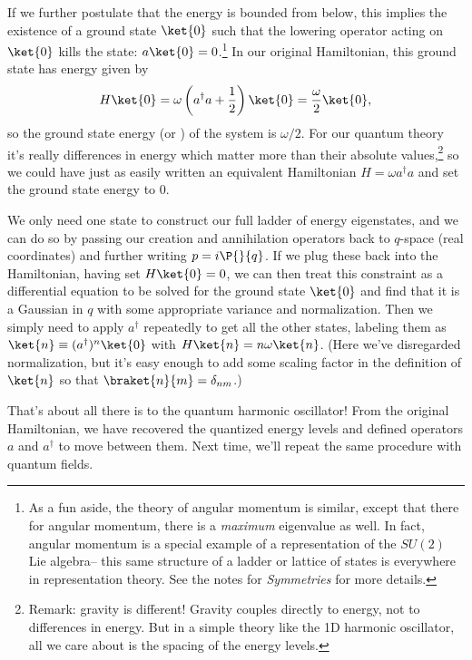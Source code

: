 If we further postulate that the energy is bounded from below, this implies the existence of a ground state $\ket{0}$ such that the lowering operator acting on $\ket{0}$ kills the state: $a\ket{0}= 0$.\footnote{As a fun aside, the theory of angular momentum is similar, except that there for angular momentum, there is a \emph{maximum} eigenvalue as well. In fact, angular momentum is a special example of a representation of the $SU(2)$ Lie algebra-- this same structure of a ladder or lattice of states is everywhere in representation theory. See the notes for \emph{Symmetries} for more details.} In our original Hamiltonian, this ground state has energy given by
$$H \ket{0}=\omega \left(a^\dagger a +\frac{1}{2}\right)\ket{0} = \frac{\omega}{2}\ket{0},$$ so the ground state energy (or ) of the system is $\omega/2$. For our quantum theory it's really differences in energy which matter more than their absolute values,\footnote{Remark: gravity is different! Gravity couples directly to energy, not to differences in energy. But in a simple theory like the 1D harmonic oscillator, all we care about is the spacing of the energy levels.} so we could have just as easily written an equivalent Hamiltonian $H=\omega a^\dagger a$ and set the ground state energy to $0$.

We only need one state to construct our full ladder of energy eigenstates, and we can do so by passing our creation and annihilation operators back to $q$-space (real coordinates) and further writing $p=i \P{}{q}$. If we plug these back into the Hamiltonian, having set $H\ket{0}=0$, we can then treat this constraint as a differential equation to be solved for the ground state $\ket{0}$ and find that it is a Gaussian in $q$ with some appropriate variance and normalization. Then we simply need to apply $a^\dagger$ repeatedly to get all the other states, labeling them as $\ket{n}\equiv(a^\dagger)^n \ket{0}$ with $H \ket{n}=n\omega \ket{n}$. (Here we've disregarded normalization, but it's easy enough to add some scaling factor in the definition of $\ket{n}$ so that $\braket{n}{m}=\delta_{nm}$.)

That's about all there is to the quantum harmonic oscillator! From the original Hamiltonian, we have recovered the quantized energy levels and defined operators $a$ and $a^\dagger$ to move between them. Next time, we'll repeat the same procedure with quantum fields.